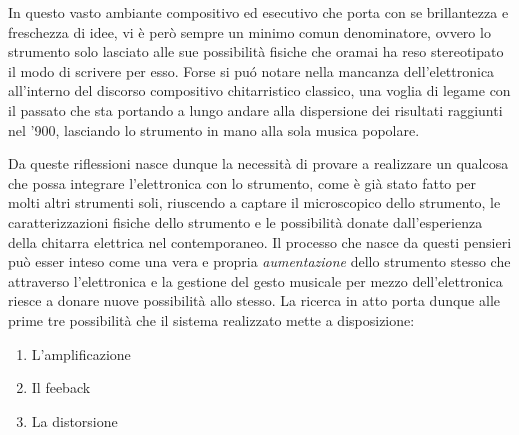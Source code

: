 \documentclass[oneside]{article}
\begin{document}
\begin{multicols*}{2}
In questo vasto ambiante compositivo ed esecutivo che porta con se brillantezza e freschezza di idee, vi è però sempre un minimo comun denominatore, ovvero lo strumento solo lasciato alle sue possibilità fisiche che oramai ha reso stereotipato il modo di scrivere per esso. Forse si puó notare nella mancanza dell'elettronica all'interno del discorso compositivo chitarristico classico, una voglia di legame con il passato che sta portando a lungo andare alla dispersione dei risultati raggiunti nel '900, lasciando lo strumento in mano alla sola musica popolare. 

\noindent Da queste riflessioni nasce dunque la necessità di provare a realizzare un qualcosa che possa integrare l'elettronica con lo strumento, come è già stato fatto per molti altri strumenti soli, riuscendo a captare il microscopico dello strumento, le caratterizzazioni fisiche dello strumento e le possibilità donate dall'esperienza della chitarra elettrica nel contemporaneo. Il processo che nasce da questi pensieri può esser inteso come una vera e propria \textit{aumentazione} dello strumento stesso che attraverso l'elettronica e la gestione del gesto musicale per mezzo dell'elettronica riesce a donare nuove possibilità allo stesso. La ricerca in atto porta dunque alle prime tre possibilità che il sistema realizzato mette a disposizione: 
\begin{enumerate}[label=(\roman*)]
\item L'amplificazione
\item Il feeback 
\item La distorsione
\end{enumerate}


\end{multicols*}
\end{document}

